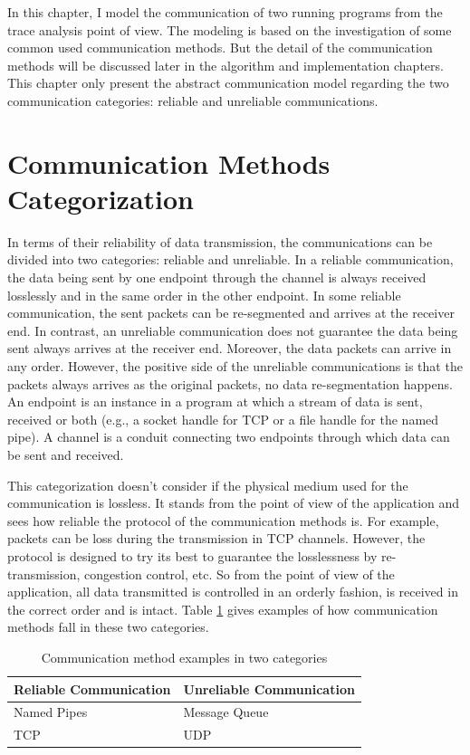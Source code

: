 
\label{chapter:mod}
In this chapter, I model the communication of two running programs from the trace analysis point of view. The modeling is based on the investigation of some common used communication methods. But the detail of the communication methods will be discussed later in the algorithm and implementation chapters. This chapter only present the abstract communication model regarding the two communication categories: reliable and unreliable communications. 

\section{Communication Methods Categorization}
In terms of their reliability of data transmission, the communications can be divided into two categories: reliable and unreliable. In a reliable communication, the data being sent by one endpoint through the channel is always received losslessly and in the same order in the other endpoint. In some reliable communication, the sent packets can be re-segmented and arrives at the receiver end. In contrast, an unreliable communication does not guarantee the data being sent always arrives at the receiver end. Moreover, the data packets can arrive in any order. However, the positive side of the unreliable communications is that the packets always arrives as the original packets, no data re-segmentation happens. An endpoint is an instance in a program at which a stream of data is sent, received or both (e.g., a socket handle for TCP or a file handle for the named pipe). A channel is a conduit connecting two endpoints through which data can be sent and received. 

This categorization doesn't consider if the physical medium used for the communication is lossless. It stands from the point of view of the application and sees how reliable the protocol of the communication methods is. For example, packets can be loss during the transmission in TCP channels. However, the protocol is designed to try its best to guarantee the losslessness by re-transmission, congestion control, etc. So from the point of view of the application, all data transmitted is controlled in an orderly fashion, is received in the correct order and is intact. Table \ref{methodsInCategories} gives examples of how communication methods fall in these two categories.
\begin{table}[H]
\centering
\caption{Communication method examples in two categories}
\label{methodsInCategories}
\begin{tabular}{|l|l|}
 \hline
\textbf{Reliable Communication}& \textbf{Unreliable Communication}\\
 \hline
Named Pipes & Message Queue   \\
TCP &  UDP \\
 \hline
\end{tabular}
\end{table}


